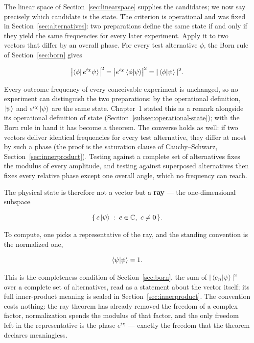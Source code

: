 The linear space of Section~\ref{sec:linearspace} supplies the candidates; we now say precisely which candidate is the state. The criterion is operational and was fixed in Section~\ref{sec:alternatives}: two preparations define the same state if and only if they yield the same frequencies for every later experiment. Apply it to two vectors that differ by an overall phase. For every test alternative $\phi$, the Born rule of Section~\ref{sec:born} gives
\begin{linenomath}
\begin{equation}
    \bigl|\braket{\phi|\,e^{i\chi}\psi}\bigr|^2
    =
    \bigl|e^{i\chi}\braket{\phi|\psi}\bigr|^2
    =
    |\braket{\phi|\psi}|^2 .
    \label{eq:ray-invariance}
\end{equation}
\end{linenomath}
Every outcome frequency of every conceivable experiment is unchanged, so no experiment can distinguish the two preparations: by the operational definition, $\ket{\psi}$ and $e^{i\chi}\ket{\psi}$ are the same state. Chapter~1 stated this as a remark alongside its operational definition of state (Section~\ref{subsec:operational-state}); with the Born rule in hand it has become a theorem. The converse holds as well: if two vectors deliver identical frequencies for every test alternative, they differ at most by such a phase (the proof is the saturation clause of Cauchy--Schwarz, Section~\ref{sec:innerproduct}). Testing against a complete set of alternatives fixes the modulus of every amplitude, and testing against superposed alternatives then fixes every relative phase except one overall angle, which no frequency can reach.

The physical state is therefore not a vector but a \textbf{ray} --- the one-dimensional subspace
\begin{linenomath}
\begin{equation}
    \{\,c\ket{\psi}\;:\;c\in\mathbb{C},\ c\neq 0\,\}.
\end{equation}
\end{linenomath}
To compute, one picks a representative of the ray, and the standing convention is the normalized one,
\begin{linenomath}
\begin{equation}
    \braket{\psi|\psi}=1 .
\end{equation}
\end{linenomath}
This is the completeness condition of Section~\ref{sec:born}, the sum of $|\braket{e_n|\psi}|^2$ over a complete set of alternatives, read as a statement about the vector itself; its full inner-product meaning is sealed in Section~\ref{sec:innerproduct}. The convention costs nothing: the ray theorem has already removed the freedom of a complex factor, normalization spends the modulus of that factor, and the only freedom left in the representative is the phase $e^{i\chi}$ --- exactly the freedom that the theorem declares meaningless.

